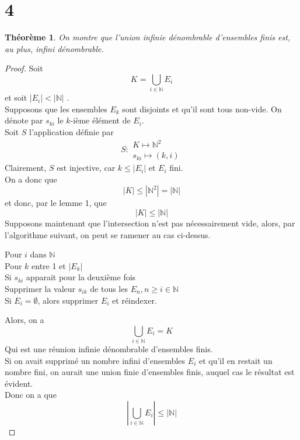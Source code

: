 \documentclass[11pt, a4paper, twoside]{article}
\newtheorem{theorem}{Théorème}
\begin{document}
\section*{4}
\begin{theorem}
	On montre que l'union infinie dénombrable d'ensembles finis est, au plus, infini dénombrable.
\end{theorem}
\begin{proof}
Soit
\[ 
K = \bigcup_{i \in \mathbb{N}} E_i
\]
et soit $|E_i| < |\mathbb{N}|$ .\\
Supposons que les ensembles $E_k$ sont disjoints et qu'il sont tous non-vide.
On dénote par $s_{ki}$ le $k$-ième élément de $E_i$.\\
Soit $S$ l'application définie par
\[
S:
\begin{array}{l}
	K \mapsto \mathbb{N}^{2}\\
	s_{ki} \mapsto (k,i)
\end{array}
\]
Clairement, $S$ est injective, car $k\leq|E_i|$ et $E_i$ fini.\\
On a donc que
\[ 
|K| \leq |\mathbb{N}^{2}| = |\mathbb{N}|
\]
et donc, par le lemme 1, que
 \[ 
|K| \leq |\mathbb{N}|
\]
Supposons maintenant que l'intersection n'est pas nécessairement vide, alors, par l'algorithme suivant, on peut se ramener au cas ci-dessus.
\begin{flushleft}
Pour $i$ dans $\mathbb{N}$ \\
\quad Pour $k$ entre 1 et $|E_k|$ \\
\quad \quad Si $s_{ki}$ apparait pour la deuxième fois\\
\quad \quad \quad Supprimer la valeur $s_{ik} $ de tous les $E_n, n\geq i \in \mathbb{N}$\\
\quad \quad Si $E_i = \emptyset$, alors supprimer $E_i$ et réindexer.
\end{flushleft}
Alors, on a
\[ 
\bigcup_{i \in \mathbb{N}} E_i = K
\]
Qui est une réunion infinie dénombrable d'ensembles finis.\\
Si on avait supprimé un nombre infini d'ensembles $E_i$ et qu'il en restait un nombre fini, on aurait une union finie d'ensembles finis, auquel cas le résultat est évident.\\
Donc on a que
\[ 
|\bigcup_{i \in \mathbb{N}} E_i| \leq |\mathbb{N}|
\]





\end{proof}
\end{document}
